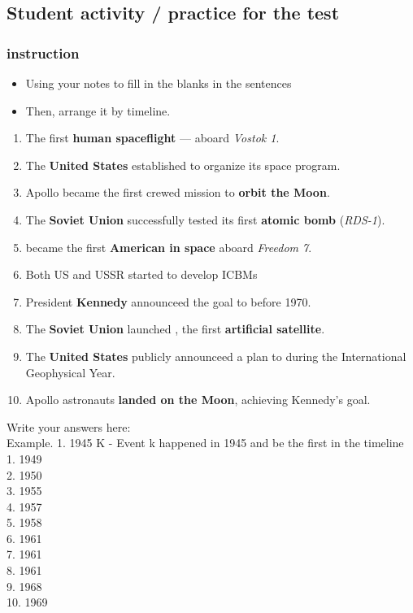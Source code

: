 \documentclass[10pt]{article}
\newcommand{\fillin}[1]{\uline{\hspace{#1}}}
\begin{document}
\newpage
\subsection*{Student activity / practice for the test}
\subsubsection*{instruction}
\begin{itemize}
    \item Using your notes to fill in the blanks in the sentences
    \item Then, arrange it by timeline.
\end{itemize}

\begin{enumerate}[label=\textbf{\Alph*.}]
    \item The first \textbf{human spaceflight} --- \fillin{5cm} aboard \textit{Vostok 1}.
    \item The \textbf{United States} established \fillin{3cm} to organize its space program.
    \item Apollo\fillin{1cm} became the first crewed mission to \textbf{orbit the Moon}.
    \item The \textbf{Soviet Union} successfully tested its first \textbf{atomic bomb} (\textit{RDS-1}).
    \item \fillin{6cm} became the first \textbf{American in space} aboard \textit{Freedom 7}.
    \item Both US and USSR started to develop ICBMs
    \item President \textbf{Kennedy} announceed the goal to \fillin{7cm} before 1970.
    \item The \textbf{Soviet Union} launched \fillin{5cm}, the first \textbf{artificial satellite}.
    \item The \textbf{United States} publicly announceed a plan to \fillin{9cm} during the International Geophysical Year.
    \item Apollo\fillin{1cm} astronauts \textbf{landed on the Moon}, achieving Kennedy’s goal.
\end{enumerate}

Write your answers here:\\

Example. 1. 1945 K - Event k happened in 1945 and be the first in the timeline \\

1. 1949 \fillin{3cm}\\

2. 1950 \fillin{3cm}\\

3. 1955 \fillin{3cm}\\

4. 1957 \fillin{3cm}\\

5. 1958 \fillin{3cm}\\

6. 1961 \fillin{3cm}\\

7. 1961 \fillin{3cm}\\

8. 1961 \fillin{3cm}\\

9. 1968 \fillin{3cm}\\

10. 1969 \fillin{3cm}\\
\end{document}
